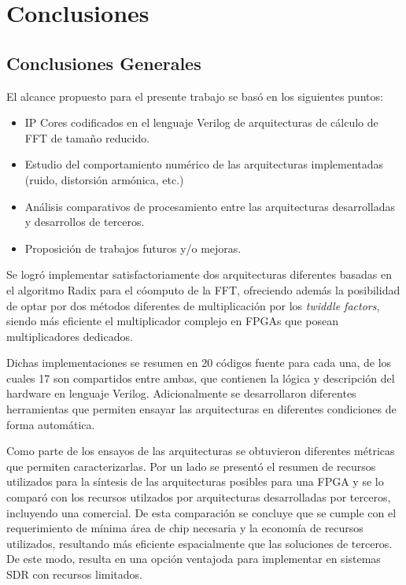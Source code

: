 \chapter{Conclusiones}

\section{Conclusiones Generales}

El alcance propuesto para el presente trabajo se basó en los siguientes puntos:

\begin{itemize}
    \item IP Cores codificados en el lenguaje Verilog de arquitecturas de
    cálculo de FFT de tamaño reducido.
    \item Estudio del comportamiento numérico de las arquitecturas implementadas (ruido, distorsión
    armónica, etc.)
    \item Análisis comparativos de procesamiento entre las arquitecturas
    desarrolladas y desarrollos de terceros.
    \item Proposición de trabajos futuros y/o mejoras.
\end{itemize}

Se logró implementar satisfactoriamente dos arquitecturas diferentes basadas en el algoritmo Radix
para el cóomputo de la FFT, ofreciendo además la posibilidad de optar por dos métodos diferentes de
multiplicación por los \textit{twiddle factors}, siendo más eficiente el multiplicador complejo en
FPGAs que posean multiplicadores dedicados.

Dichas implementaciones se resumen en 20 códigos fuente para cada una, de los cuales 17 son
compartidos entre ambas, que contienen la lógica y descripción del hardware en lenguaje Verilog.
Adicionalmente se desarrollaron diferentes herramientas que permiten ensayar las arquitecturas en
diferentes condiciones de forma automática.

Como parte de los ensayos de las arquitecturas se obtuvieron diferentes métricas que permiten
caracterizarlas. Por un lado se presentó el resumen de recursos utilizados para la síntesis de las
arquitecturas posibles para una FPGA y se lo comparó con los recursos utilzados por arquitecturas
desarrolladas por terceros, incluyendo una comercial. De esta comparación se concluye que se cumple
con el requerimiento de mínima área de chip necesaria y la economía de recursos utilizados,
resultando más eficiente espacialmente que las soluciones de terceros. De este modo, resulta en una
opción ventajoda para implementar en sistemas SDR con recursos limitados.

